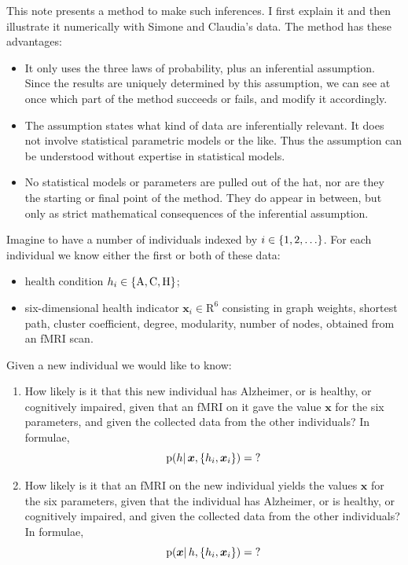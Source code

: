 \documentclass[\ifafour a4paper,12pt,\else a5paper,10pt,\fi%
onecolumn,oneside,article,%
british%
]{memoir}
\theoremstyle{remark}
\theoremstyle{innote}
\newcommand*{\RR}{\bm{\mathrm{R}}}
\DeclarePairedDelimiter\set{\{}{\}}
\newcommand*{\pf}{\mathrm{p}}%
\renewcommand*{\|}{\mathpunct{|}}
\newcommand*{\yH}{h}
\newcommand*{\yx}{x}
\newcommand*{\yxx}{\bm{\yx}}
\newcommand*{\ya}{\mathrm{A}}
\newcommand*{\yi}{\mathrm{C}}
\newcommand*{\yh}{\mathrm{H}}
\theoremstyle{plain}
\begin{document}
This note presents a method to make such inferences. I first explain it and
then illustrate it numerically with Simone and Claudia's data. The method
has these advantages:
\begin{itemize}
\item It only uses the three laws of probability, plus an inferential
  assumption. Since the results are uniquely determined by this assumption,
  we can see at once which part of the method succeeds or fails, and
  modify it accordingly.
\item The assumption states what kind of data are inferentially relevant.
  It does not involve statistical parametric models or the like. Thus the
  assumption can be understood without expertise in statistical models.
\item No statistical models or parameters are pulled out of the hat, nor
  are they the starting or final point of the method. They do appear in
  between, but only as strict mathematical consequences of the inferential
  assumption.
\end{itemize}
  

\bigskip

Imagine to have a number of individuals indexed by $i\in\set{1,2,\dotsc}$.
For each individual we know either the first or both of these data:
\begin{itemize}
\item health condition $\yH_i \in \set{\ya, \yi, \yh}$;
\item six-dimensional health indicator $\yxx_i \in \RR^6$ consisting in
  graph weights, shortest path, cluster coefficient, degree, modularity,
  number of nodes, obtained from an fMRI scan.
\end{itemize}

\bigskip

Given a new individual we would like to know:
\begin{enumerate}[wide]
\item How likely is it that this new individual has Alzheimer, or is
  healthy, or cognitively impaired, given that an fMRI on it gave the value
  $\yxx$ for the six parameters, and given the collected data from the
  other individuals? In formulae,
  \begin{equation}
    \label{eq:health_from_fmri}
    \pf(\yH \| \yxx, \set{\yH_i,\yxx_i})=\mathord{?}
  \end{equation}
\item How likely is it that an fMRI on the new individual yields the values
  $\yxx$ for the six parameters, given that the individual has Alzheimer,
  or is healthy, or cognitively impaired, and given the collected data from
  the other individuals? In formulae,
  \begin{equation}
    \label{eq:fmri_from_health}
    \pf(\yxx \| \yH, \set{\yH_i,\yxx_i})=\mathord{?}
  \end{equation}
\end{enumerate}
\end{document}
